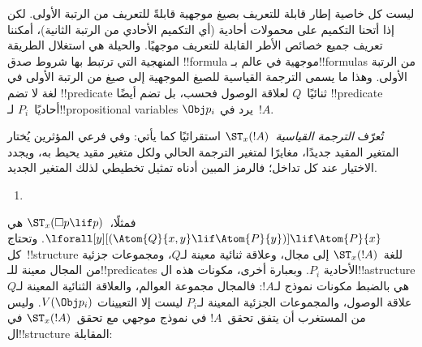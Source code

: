 \documentclass[../../../include/open-logic-section]{subfiles}
\begin{document}


ليست كل خاصية إطار قابلة للتعريف بصيغ موجهية قابلةً للتعريف من
الرتبة الأولى. لكن إذا أتحنا التكميم على محمولات أحادية (أي التكميم
الأحادي من الرتبة الثانية)، أمكننا تعريف جميع خصائص الأطر القابلة
للتعريف موجهيًا. والحيلة هي استغلال الطريقة المنهجية التي ترتبط بها
شروط صدق !!{formula} موجهية في عالم بـ!!{formula}s من الرتبة الأولى.
وهذا ما يسمى الترجمة القياسية للصيغ الموجهية إلى صيغ من الرتبة
الأولى في لغة لا تضم !!{predicate} ثنائيًا~$Q$ لعلاقة الوصول فحسب، بل
تضم أيضًا !!{predicate} أحاديًا~$P_i$ لـ!!{propositional variable}s
$\Obj p_i$ يرد في~$!A$.

\begin{defn}
  تُعرّف \emph{الترجمة القياسية}~$\ST_x(!A)$ استقرائيًا كما يأتي:
  وفي فرعي المؤثرين يُختار المتغير المقيد جديدًا، مغايرًا لمتغير
  الترجمة الحالي ولكل متغير مقيد يحيط به، ويجدد الاختيار عند كل تداخل؛
  فالرمز المبين أدناه تمثيل تخطيطي لذلك المتغير الجديد.
  \begin{enumerate}
  \item {}
  \end{enumerate}
\end{defn}

فمثلًا،~$\ST_x(\Box p \lif p)$ هي
$\lforall[y][(\Atom{Q}{x,y} \lif \Atom{P}{y})] \lif \Atom{P}{x}$.
وتحتاج كل~!!{structure} للغة~$\ST_x(!A)$ إلى مجال، وعلاقة ثنائية
معينة لـ$Q$، ومجموعات جزئية من المجال معينة للـ!!{predicate}s الأحادية
$P_i$. وبعبارة أخرى، مكونات هذه ال!!a{structure} هي بالضبط مكونات
نموذج لـ$!A$: فالمجال مجموعة العوالم، والعلاقة الثنائية المعينة لـ$Q$
علاقة الوصول، والمجموعات الجزئية المعينة لـ$P_i$ ليست إلا التعيينات
$V(\Obj p_i)$. وليس من المستغرب أن يتفق تحقق~$!A$ في نموذج موجهي مع
تحقق~$\ST_x(!A)$ في ال!!{structure} المقابلة:
\end{document}
